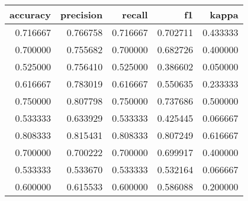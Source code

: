 \begin{tabular}{rrrrr}
\toprule
accuracy & precision & recall & f1 & kappa \\
\midrule
0.716667 & 0.766758 & 0.716667 & 0.702711 & 0.433333 \\
0.700000 & 0.755682 & 0.700000 & 0.682726 & 0.400000 \\
0.525000 & 0.756410 & 0.525000 & 0.386602 & 0.050000 \\
0.616667 & 0.783019 & 0.616667 & 0.550635 & 0.233333 \\
0.750000 & 0.807798 & 0.750000 & 0.737686 & 0.500000 \\
0.533333 & 0.633929 & 0.533333 & 0.425445 & 0.066667 \\
0.808333 & 0.815431 & 0.808333 & 0.807249 & 0.616667 \\
0.700000 & 0.700222 & 0.700000 & 0.699917 & 0.400000 \\
0.533333 & 0.533670 & 0.533333 & 0.532164 & 0.066667 \\
0.600000 & 0.615533 & 0.600000 & 0.586088 & 0.200000 \\
\bottomrule
\end{tabular}
